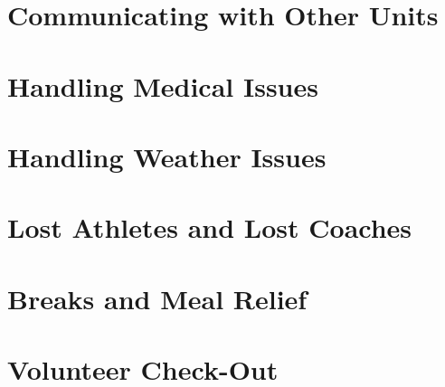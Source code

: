 \documentclass[pdflatex,letterpaper,twoside,12pt]{book}
\begin{document}
\iffalse %
 * Clearly define what types of calls go to Logistics
     o Pieces, parts, 
\fi


\section{Communicating with Other Units}


\section{Handling Medical Issues}


\section{Handling Weather Issues}


\section{Lost Athletes and Lost Coaches}


\section{Breaks and Meal Relief}


\section{Volunteer Check-Out}
\end{document}
